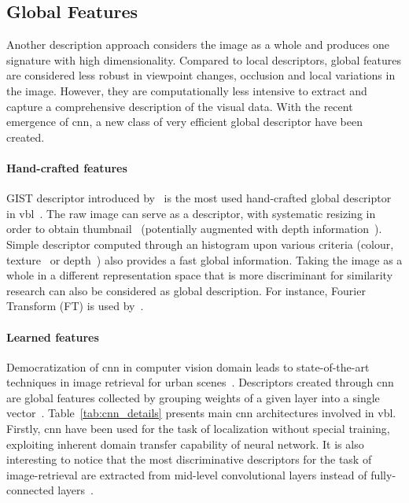 	\subsection{Global Features}
	\label{subsec:global_feature}
		Another description approach considers the image as a whole and produces one signature with high dimensionality. Compared to local descriptors, global features are considered less robust in viewpoint changes, occlusion and local variations in the image. However, they are computationally less intensive to extract and capture a comprehensive description of the visual data. With the recent emergence of \ac{cnn}, a new class of very efficient global descriptor have been created.
		
		\paragraph{Hand-crafted features}
		 	GIST descriptor introduced by~\citet{Oliva2001} is the most used hand-crafted global descriptor in \ac{vbl}~\citep{Russell2011,Azzi2016,Hays2008}. The raw image can serve as a descriptor, with systematic resizing in order to obtain thumbnail~\citep{Hays2008,Corke2013} (potentially augmented with depth information~\citep{Gee2012}). Simple descriptor computed through an histogram upon various criteria (colour, texture~\citep{Hays2008} or depth~\citep{Ni2009}) also provides a fast global information. Taking the image as a whole in a different representation space that is more discriminant for similarity research can also be considered as global description. For instance, Fourier Transform (FT) is used by~\citet{Wan2016}.
			
		\paragraph{Learned features} 
			\label{para:global_cnn}
			Democratization of \ac{cnn} in computer vision domain leads to state-of-the-art techniques in image retrieval for urban scenes~\citep{Arandjelovic2016,Gordo2016,Kim2017a,Radenovic2016}. Descriptors created through \ac{cnn} are global features collected by grouping weights of a given layer into a single vector~\citep{Babenko2014}. Table~\ref{tab:cnn_details} presents main \ac{cnn} architectures involved in \ac{vbl}. Firstly, \ac{cnn} have been used for the task of localization without special training, exploiting inherent domain transfer capability of neural network. It is also interesting to notice that the most discriminative descriptors for the task of image-retrieval are extracted from mid-level convolutional layers instead of fully-connected layers~\citep{Babenko2014,Sunderhauf2015}.
			
